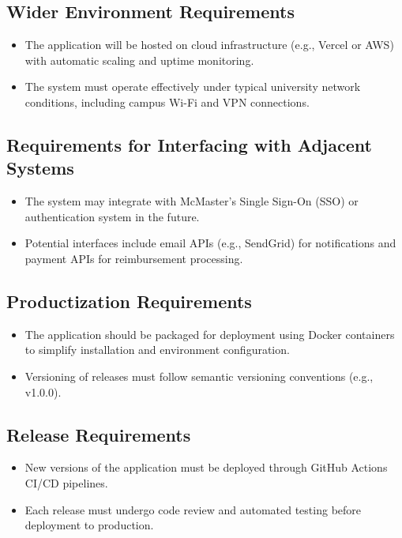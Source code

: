 \documentclass[12pt]{article}
\begin{document}
  \subsection{Wider Environment Requirements}
    \begin{itemize}
      \item The application will be hosted on cloud infrastructure (e.g., Vercel or AWS) with automatic scaling and uptime monitoring.
      \item The system must operate effectively under typical university network conditions, including campus Wi-Fi and VPN connections.
    \end{itemize}

  \subsection{Requirements for Interfacing with Adjacent Systems}
    \begin{itemize}
      \item The system may integrate with McMaster's Single Sign-On (SSO) or authentication system in the future.
      \item Potential interfaces include email APIs (e.g., SendGrid) for notifications and payment APIs for reimbursement processing.
    \end{itemize}

  \subsection{Productization Requirements}
    \begin{itemize}
      \item The application should be packaged for deployment using Docker containers to simplify installation and environment configuration.
      \item Versioning of releases must follow semantic versioning conventions (e.g., v1.0.0).
    \end{itemize}

  \subsection{Release Requirements}
    \begin{itemize}
      \item New versions of the application must be deployed through GitHub Actions CI/CD pipelines.
      \item Each release must undergo code review and automated testing before deployment to production.
    \end{itemize}
\end{document}
